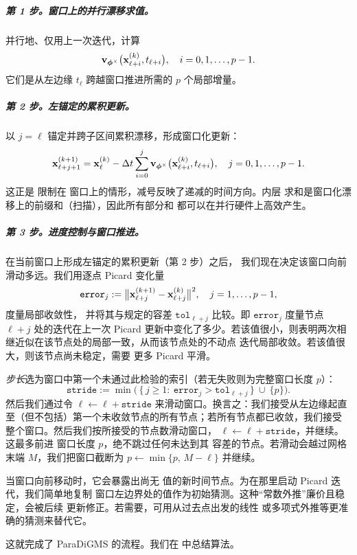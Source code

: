 \subparagraph{第 1 步。窗口上的并行漂移求值。}
并行地、仅用上一次迭代，计算
\[
{\mathbf{v}}_{{\bm{\phi}}^\times} \big({\mathbf{x}}^{(k)}_{\ell+i}, t_{\ell+i}\big),
\quad i=0,1,\ldots,p-1.
\]
它们是从左边缘
$t_\ell$ 跨越窗口推进所需的 $p$ 个局部增量。

\subparagraph{第 2 步。左锚定的累积更新。}
以 $j=\ell$ 锚定并跨子区间累积漂移，形成窗口化更新：
\begin{equation}\label{eq:window_update}
{\mathbf{x}}^{(k+1)}_{\ell+j+1}
 = 
{\mathbf{x}}^{(k)}_{\ell}
 - \Delta t \sum_{i=0}^{j}
{\mathbf{v}}_{{\bm{\phi}}^\times} \big({\mathbf{x}}^{(k)}_{\ell+i}, t_{\ell+i}\big),
\quad j=0,1,\ldots,p-1.
\end{equation}
这正是  限制在
窗口上的情形，减号反映了递减的时间方向。内层
求和是窗口化漂移上的前缀和（扫描），因此所有部分和
都可以在并行硬件上高效产生。

\subparagraph{第 3 步。进度控制与窗口推进。}
在当前窗口上形成左锚定的累积更新（第 2 步）之后，
我们现在决定该窗口向前滑动多远。我们用逐点 Picard 变化量
\[
\mathtt{error}_j
:=
\big\|{\mathbf{x}}^{(k+1)}_{\ell+j}-{\mathbf{x}}^{(k)}_{\ell+j}\big\|^2,
\quad j=1,\ldots,p-1,
\]
度量局部收敛性，
并将其与规定的容差 $\mathtt{tol}_{\ell+j}$ 比较。即 $\mathtt{error}_j$ 度量节点 $\ell+j$ 处的迭代在上一次 Picard
更新中变化了多少。若该值很小，则表明两次相继近似在该节点处的局部一致，从而该节点处的不动点
迭代局部收敛。若该值很大，则该节点尚未稳定，需要
更多 Picard 平滑。


\emph{步长}选为窗口中第一个未通过此检验的索引（若无失败则为完整窗口长度 $p$）：
\[
\mathtt{stride}
:=
\min\Big(\,\{\,j\ge 1:\ \mathtt{error}_j>\mathtt{tol}_{\ell+j}\,\}\ \cup\ \{p\}\Big).
\]
然后我们通过令 $\ell \leftarrow \ell+\mathtt{stride}$ 来滑动窗口。换言之：我们接受从左边缘起直至（但不包括）第一个未收敛节点的所有节点；若所有节点都已收敛，我们接受
整个窗口。然后我们按所接受的节点数滑动窗口，
$\ell \leftarrow \ell+\mathtt{stride}$，并继续。这最多前进
窗口长度 $p$，绝不跳过任何未达到其
容差的节点。若滑动会越过网格末端 $M$，我们把窗口截断为
$p \leftarrow \min\{p,\,M-\ell\}$ 并继续。



当窗口向前移动时，它会暴露出尚无
值的新时间节点。为在那里启动 Picard 迭代，我们简单地复制
窗口左边界处的值作为初始猜测。这种“常数外推”廉价且稳定，会被后续
更新修正。若需要，可用从过去点出发的线性
或多项式外推等更准确的猜测来替代它。

这就完成了 ParaDiGMS 的流程。我们在  中总结算法。


